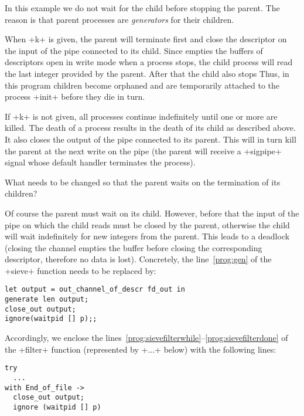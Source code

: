 In this example we do not wait for the child before stopping the
parent. The reason is that parent processes are \emph{generators} for
their children.

When \ml+k+ is given, the parent will terminate first and close
the descriptor on the input of the pipe connected to its child. Since
{\ocaml} empties the buffers of descriptors open in write mode when a
process stops, the child process will read the last integer provided
by the parent. After that the child also stops {\etc} Thus, in this
program children become orphaned and are temporarily attached to the
process \ml+init+ before they die in turn.

If \ml+k+ is not given, all processes continue indefinitely until one or
more are killed. The death of a process results in the death of its child
as described above. It also closes the output of the pipe connected to
its parent. This will in turn kill the parent at the next write on the
pipe (the parent will receive a \ml+sigpipe+ signal whose default
handler terminates the process).

\begin{exercise}
What needs to be changed so that the parent waits on the termination
of its children?
\end{exercise}
\begin{answer}
Of course the parent must wait on its child. However, before that the
input of the pipe on which the child reads must be closed by the
parent, otherwise the child will wait indefinitely for new integers from the
parent. This leads to a deadlock (closing the channel empties the
buffer before closing the corresponding descriptor, therefore no data
is lost).  Concretely, the line~\ref{prog:gen} of the \ml+sieve+
function needs to be replaced by:
\begin{lstlisting}
let output = out_channel_of_descr fd_out in
generate len output;
close_out output;
ignore(waitpid [] p);;
\end{lstlisting}
Accordingly, we enclose the 
lines~\ref{prog:sievefilterwhile}--\ref{prog:sievefilterdone} of the 
\ml+filter+ function (represented by \ml+...+ below) with the
following lines:
\begin{lstlisting}
try 
  ...
with End_of_file -> 
  close_out output;
  ignore (waitpid [] p)
\end{lstlisting}
\end{answer}

